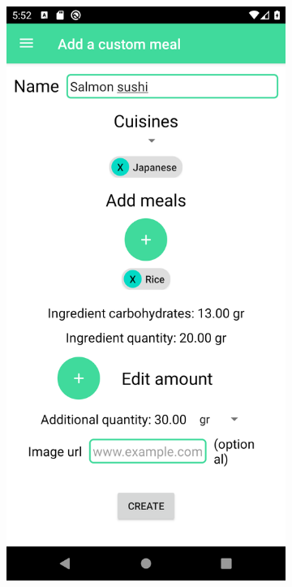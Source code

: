 \begin{figure}[H]
    \captionsetup[subfigure]{justification=centering}
    \begin{center}
        \begin{subfigure}{.3\textwidth}
            \includegraphics[scale=0.1, width=\textwidth]{_figures/create_custom_meal.png}

\end{subfigure}
\end{center}
\end{figure}
